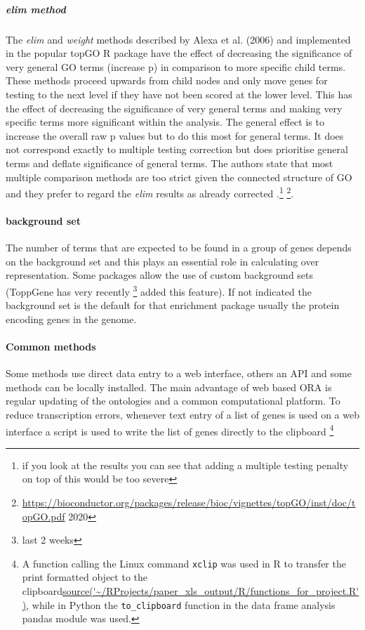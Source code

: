 \subparagraph{elim method}
The \textit{elim} and \textit{weight} methods described by Alexa et al. (2006)   \cite{alexa2006improved} and implemented in the popular topGO R  package\cite{alexa2009gene} have the effect of decreasing the significance of very general GO terms (increase p) in comparison to more specific child terms. These methods proceed upwards from child nodes and only move genes for testing to the next level if they have not been scored at the lower level. This has the effect of decreasing the significance of very general terms and making very specific terms more significant within the  analysis. The general effect is to increase the overall raw p values but to do this most for general terms.  It does not correspond exactly to multiple testing correction but does prioritise general terms and deflate significance of general terms.  The authors state that most multiple comparison methods are too strict given the connected structure of GO and they prefer to regard the \textit{elim} results as already corrected \cite{alexa2020gene}.\footnote{if you look at the results you can see that adding a multiple testing penalty on top of this would be too severe} \footnote{\url{https://bioconductor.org/packages/release/bioc/vignettes/topGO/inst/doc/topGO.pdf} 2020}.
\paragraph{background set}
The number of terms that are expected to be found in a group of genes depends on the background set and this plays an essential role in calculating over representation. Some packages allow the use of custom background sets (ToppGene has very recently \footnote{last 2 weeks} added this feature). If not indicated the background set is the default for that enrichment package usually the protein encoding genes in the genome.  

\paragraph{Common methods}
Some methods use direct data entry to a web interface, others an API and some methods can be locally installed. The main advantage of web based ORA is regular updating of the ontologies and a common computational platform. To reduce transcription errors, whenever text entry of a list of genes is used on a web interface a script is used to write the list of genes directly to the clipboard \footnote{A function calling the Linux command \texttt{xclip} was used in R to transfer the print formatted object to the clipboard\url{source('~/RProjects/paper_xls_output/R/functions_for_project.R')}, while in Python the \texttt{to\_clipboard} function in the data frame analysis pandas module was used\cite{mckinney2011pandas}.} 
